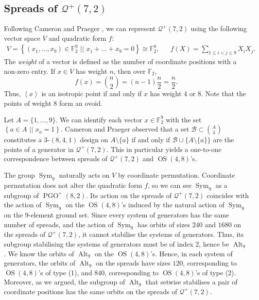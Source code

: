 \documentclass[a4paper]{article}
\theoremstyle{definition}
\newcommand{\FF}{\mathbb F}
\renewcommand{\leq}{\leqslant}
\newcommand{\vspan}[1]{\left \langle #1 \right \rangle}
\newcommand{\sett}[2]{ \left\{ #1 \, \, || \, \, #2 \right \} }
\newcommand{\mb}{\mathcal B}
\newcommand{\mq}{\mathcal Q}
\DeclareMathOperator{\PGO}{PGO}
\DeclareMathOperator{\Sym}{Sym}
\DeclareMathOperator{\OS}{OS}
\DeclareMathOperator{\Alt}{Alt}
\begin{document}
\subsection{Spreads \texorpdfstring{of $\mq^+(7,2)$}{}}

Following Cameron and Praeger \cite{Cameron:Praeger}, we can represent $\mq^+(7,2)$ using the following vector space $V$ and quadratic form $f$:
\begin{align}
 \label{Eq:CP}
 V = \sett{(x_1, \ldots, x_9) \in \FF_2^9}{x_1 + \ldots + x_9 = 0} \cong \FF_2^8,
 && f(X) = \sum_{1 \leq i < j \leq 9} X_i X_j.
\end{align}
The \emph{weight} of a vector is defined as the number of coordinate positions with a non-zero entry.
If $x \in V$ has weight $n$, then over $\FF_2$,
\[
 f(x) = \binom n2 = (n-1) \frac n2 = \frac n2.
\]
Thus, $\vspan x$ is an isotropic point if and only if $x$ has weight 4 or 8.
Note that the points of weight 8 form an ovoid.

Let $A = \{1, \dots, 9\}$.
We can identify each vector $x \in \FF_2^9$ with the set $\sett{a \in A}{x_a = 1}$.
Cameron and Praeger \cite{Cameron:Praeger} observed that a set $\mb \subset \binom A4$ constitutes a $3$-$(8,4,1)$ design on $A \setminus \{a\}$ if and only if $\mb \cup \{ A \setminus \{a\}\}$ are the points of a generator in $\mq^+(7,2)$.
This in particular yields a one-to-one correspondence between spreads of $\mq^+(7,2)$ and $\OS(4,8)$'s.

The group $\Sym_9$ naturally acts on $V$ by coordinate permutation.
Coordinate permutation does not alter the quadratic form $f$, so we can see $\Sym_9$ as a subgroup of $\PGO^+(8,2)$.
Its action on the spreads of $\mq^+(7,2)$ coincides with the action of $\Sym_9$ on the $\OS(4,8)$'s induced by the natural action of $\Sym_9$ on the 9-element ground set.
Since every system of generators has the same number of spreads, and the action of $\Sym_9$ has orbits of sizes $240$ and $1680$ on the spreads of $\mq^+(7,2)$, it cannot stabilise the systems of generators.
Thus, its subgroup stabilising the systems of generators must be of index 2, hence be $\Alt_9$.
We know the orbits of $\Alt_9$ on the $\OS(4,8)$'s.
Hence, in each system of generators, the orbits of $\Alt_9$ on the spreads have sizes $120$, corresponding to $\OS(4,8)$'s of type (1), and $840$, corresponding to $\OS(4,8)$'s of type (2).
Moreover, as we argued, the subgroup of $\Alt_9$ that setwise stabilises a pair of coordinate positions has the same orbits on the spreads of $\mq^+(7,2)$.
\end{document}
